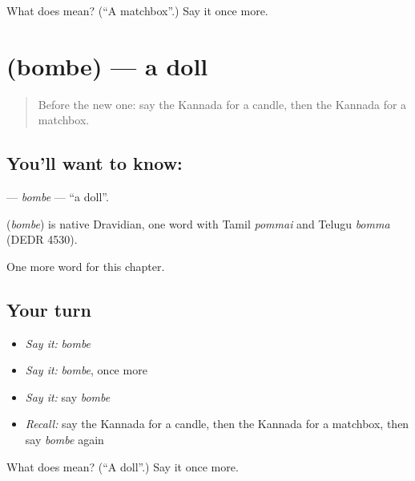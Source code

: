 \begin{tcolorbox}[breakable,colback=teal!4,colframe=teal!35!black,title={Before you move on}]
What does  mean? (\textquotedblleft{}A matchbox\textquotedblright{}.) Say it once more.
\end{tcolorbox}
\section[\texorpdfstring{\kn{ಬೊಂಬೆ} (bombe)}{ಬೊಂಬೆ (bombe)}]{ (bombe) — a doll}

\label{lesson:KA-C119-bombe}



\begin{quote}
Before the new one: say the Kannada for a candle, then the Kannada for a matchbox.
\end{quote}

\subsection*{You'll want to know: }
\textbf{} — \emph{bombe} — \textquotedblleft{}a doll\textquotedblright{}.

\begin{cousinweb}
\textbf{} (\emph{bombe}) is native Dravidian, one word with Tamil \emph{pommai} and Telugu \emph{bomma} (DEDR 4530).
\end{cousinweb}

\begin{grammarlens}[title={What you've built}]
One more word for this chapter.
\end{grammarlens}

\subsection*{Your turn}
\begin{itemize}
\raggedright
  \item \emph{Say it:} \emph{bombe}
  \item \emph{Say it:} \emph{bombe}, once more
  \item \emph{Say it:} say \emph{bombe}
  \item \emph{Recall:} say the Kannada for a candle, then the Kannada for a matchbox, then say \emph{bombe} again
\end{itemize}

\begin{tcolorbox}[breakable,colback=teal!4,colframe=teal!35!black,title={Before you move on}]
What does  mean? (\textquotedblleft{}A doll\textquotedblright{}.) Say it once more.
\end{tcolorbox}
